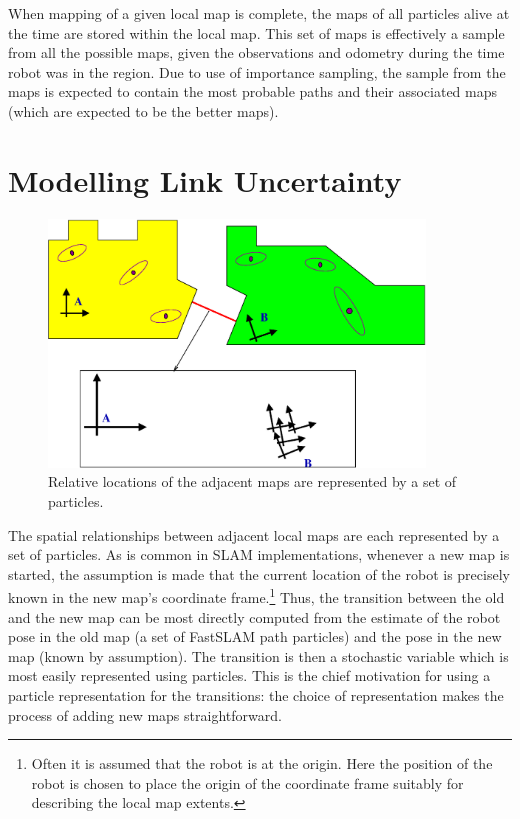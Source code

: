 When mapping of a given local map is complete, the maps of all
particles alive at the time are stored within the local map. This set
of maps is effectively a sample from all the possible maps, given the
observations and odometry during the time robot was in the region.
Due to use of importance sampling, the sample from the maps is
expected to contain the most probable paths and their associated maps
(which are expected to be the better maps).

\section{Modelling Link Uncertainty}
\label{sec:link}

\begin{figure}
\begin{center}
\includegraphics[width=10cm]{Pics/fig_transition_model}
\end{center}
\caption[Modeling transition distribution]
{Relative locations of the adjacent maps are represented by a
  set of particles.}
\end{figure}

The spatial relationships between adjacent local maps are each
represented by a set of particles.  As is common in SLAM
implementations, whenever a new map is started, the assumption is made
that the current location of the robot is precisely known in the new
map's coordinate frame.\footnote{Often it is assumed that the robot is
at the origin.  Here the position of the robot is chosen to place the
origin of the coordinate frame suitably for describing the local map
extents.} Thus, the transition between the old and the new map can be
most directly computed from the estimate of the robot pose in the old
map (a set of FastSLAM path particles) and the pose in the new map
(known by assumption). The transition is then a stochastic variable
which is most easily represented using particles. This is the chief
motivation for using a particle representation for the
transitions: the choice of representation makes the process of adding
new maps straightforward.

